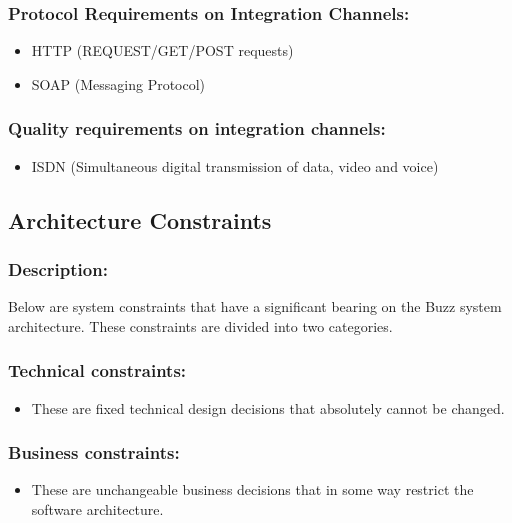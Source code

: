 \documentclass[11pt]{article}
\begin{document}
			\subsubsection{Protocol Requirements on Integration Channels:}
			\begin{itemize}			
			
				\item HTTP (REQUEST/GET/POST requests)
				\item SOAP (Messaging Protocol)
				
			\end{itemize}	
			
			\subsubsection{Quality requirements on integration channels:}
			\begin{itemize}			
			
				\item ISDN (Simultaneous digital transmission of data, video and voice)
				
			\end{itemize}	

	\newpage
	\begin{center}
	\section{\textbf{\huge{Architecture Constraints}}}
	\end{center}
		\subsubsection{Description:}
		\textbf{}Below are system constraints that have a significant bearing on the Buzz system architecture.
		These constraints are divided into two categories.
		
		
	
	\subsubsection{Technical constraints:}
	\begin{itemize}
		\item These are fixed technical design decisions that absolutely cannot be changed.
	\end{itemize}
	\subsubsection{Business constraints:}
	\begin{itemize}
		\item These are unchangeable business decisions that in some way restrict the software architecture.
	\end{itemize}
	
\end{document}
